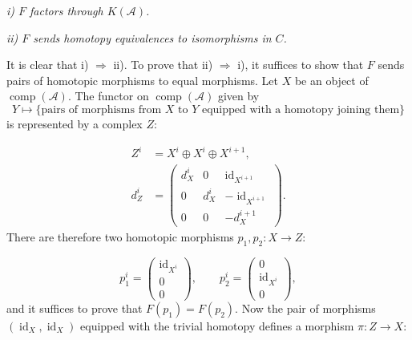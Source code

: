 \clearpage
{}%
\begingroup\small\setlength{\parskip}{0pt}\setlength{\emergencystretch}{1.5em}
\setlength{\abovedisplayskip}{4pt plus 2pt minus 2pt}%
\setlength{\belowdisplayskip}{4pt plus 2pt minus 2pt}%

\noindent\textit{i) $F$ factors through $K(\mathcal A)$.}

\noindent\textit{ii) $F$ sends homotopy equivalences to isomorphisms in
$C$.}

It is clear that i) $\Rightarrow$ ii). To prove that ii)
$\Rightarrow$ i), it suffices to show that $F$ sends pairs of homotopic
morphisms to equal morphisms. Let $X$ be an object of
$\operatorname{comp}(\mathcal A)$. The functor on
$\operatorname{comp}(\mathcal A)$ given by
\[
Y\longmapsto
\{\text{pairs of morphisms from $X$ to $Y$ equipped with a homotopy joining
them}\}
\]
is represented by a complex $Z$:

\begin{equation}
\begin{aligned}
Z^i&=X^i\oplus X^i\oplus X^{i+1},\\[2pt]
d_Z^i&=
\begin{pmatrix}
d_X^i&0&\operatorname{id}_{X^{i+1}}\\
0&d_X^i&-\operatorname{id}_{X^{i+1}}\\
0&0&-d_X^{i+1}
\end{pmatrix}.
\end{aligned}
\tag{1.3.6.1}
\end{equation}
There are therefore two homotopic morphisms
$p_1,p_2\colon X\longrightarrow Z$:

\begin{equation}
p_1^i=
\begin{pmatrix}
\operatorname{id}_{X^i}\\0\\0
\end{pmatrix},
\qquad
p_2^i=
\begin{pmatrix}
0\\\operatorname{id}_{X^i}\\0
\end{pmatrix},
\tag{1.3.6.2}
\end{equation}
and it suffices to prove that $F(p_1)=F(p_2)$. Now the pair of morphisms
$(\operatorname{id}_X,\operatorname{id}_X)$ equipped with the trivial
homotopy defines a morphism $\pi\colon Z\longrightarrow X$:

